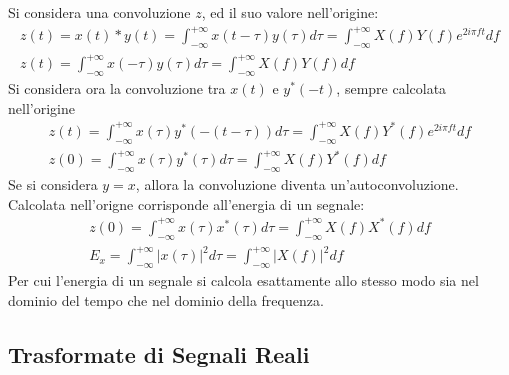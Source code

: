 \documentclass{article}
\numberwithin{equation}{subsection}
\begin{document}
Si considera una convoluzione $z$, ed il suo valore nell'origine:
\begin{gather*}
    z(t)=x(t)*y(t)=\displaystyle\int_{-\infty}^{+\infty}x(t-\tau)y(\tau)d\tau=\int_{-\infty}^{+\infty}X(f)Y(f)e^{2i\pi ft}df\\
    z(t)=\displaystyle\int_{-\infty}^{+\infty}x(-\tau)y(\tau)d\tau=\int_{-\infty}^{+\infty}X(f)Y(f)df
\end{gather*}
Si considera ora la convoluzione tra $x(t)$ e $y^*(-t)$, sempre calcolata nell'origine
\begin{gather*}
    z(t)=\displaystyle\int_{-\infty}^{+\infty}x(\tau)y^*(-(t-\tau))d\tau=\int_{-\infty}^{+\infty}X(f)Y^*(f)e^{2i\pi ft}df\\
    z(0)=\displaystyle\int_{-\infty}^{+\infty}x(\tau)y^*(\tau)d\tau=\int_{-\infty}^{+\infty}X(f)Y^*(f)df
\end{gather*}
Se si considera $y=x$, allora la convoluzione diventa un'autoconvoluzione. Calcolata nell'origne corrisponde all'energia di un segnale:
\begin{gather*}
    z(0)=\displaystyle\int_{-\infty}^{+\infty}x(\tau)x^*(\tau)d\tau=\int_{-\infty}^{+\infty}X(f)X^*(f)df\\
    E_x=\displaystyle\int_{-\infty}^{+\infty}|x(\tau)|^2d\tau=\int_{-\infty}^{+\infty}|X(f)|^2df
\end{gather*}
Per cui l'energia di un segnale si calcola esattamente allo stesso modo sia nel dominio del tempo che nel dominio della frequenza. 

\subsection{Trasformate di Segnali Reali}
\end{document}
